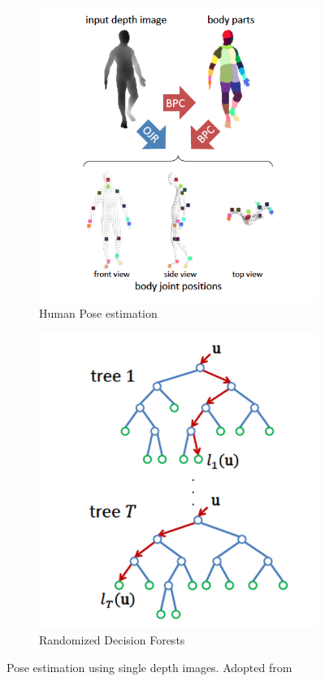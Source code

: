 \begin{figure}[H]
\centering
\begin{subfigure}[b]{0.35\textwidth}
\includegraphics[width=\textwidth]{assets/kinect_approaches.png}
\caption{Human Pose estimation}
\label{fig:kinect_pose}
\end{subfigure}
\begin{subfigure}[b]{0.35\textwidth}
\includegraphics[width=\textwidth]{assets/forest.png}
\caption{Randomized Decision Forests}
\label{fig:decision_forests}
\end{subfigure}
\caption[Human pose estimation using single depth images]{Pose estimation using single depth images. {Adopted from \cite{shotton2013efficient}}}
\end{figure}
